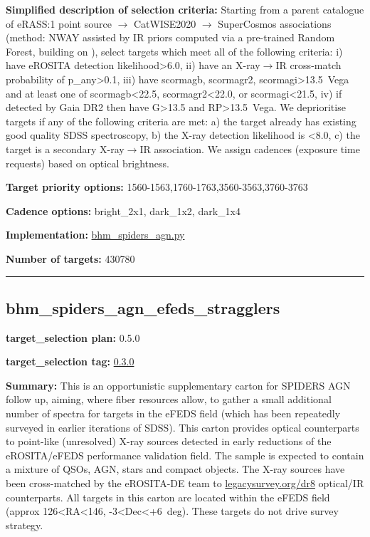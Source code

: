 \noindent\textbf{Simplified description of selection criteria:} Starting from a
parent catalogue of eRASS:1 point source $\rightarrow$ CatWISE2020 $\rightarrow$ SuperCosmos
associations (method: NWAY assisted by IR priors computed via a
pre-trained Random Forest, building on
\citealt{Salvato2022}), select targets which meet all of the following criteria:
i) have eROSITA detection likelihood\textgreater6.0, ii) have an
X-ray$\rightarrow$IR cross-match probability of p\_any\textgreater0.1, iii) have
scormagb, scormagr2, scormagi\textgreater13.5~Vega and at least one of
scormagb\textless22.5, scormagr2\textless22.0, or scormagi\textless21.5,
iv) if detected by Gaia DR2 then have G\textgreater13.5 and
RP\textgreater13.5~Vega. We deprioritise targets if any of the following
criteria are met: a) the target already has existing good quality SDSS
spectroscopy, b) the X-ray detection likelihood is \textless8.0, c) the
target is a secondary X-ray$\rightarrow$IR association. We assign cadences (exposure
time requests) based on optical brightness.


\noindent\textbf{Target priority options:}
1560-1563,1760-1763,3560-3563,3760-3763

\noindent\textbf{Cadence options:} bright\_2x1, dark\_1x2, dark\_1x4

\noindent\textbf{Implementation:}
\href{https://github.com/sdss/target_selection/blob/0.3.0/python/target_selection/cartons/bhm_spiders_agn.py}{bhm\_spiders\_agn.py}

\noindent\textbf{Number of targets:} 430780

\begin{center}\rule{0.5\linewidth}{0.5pt}\end{center}

\hypertarget{bhm_spiders_agn_efeds_stragglers_plan0.5.0}{%
\subsection{bhm\_spiders\_agn\_efeds\_stragglers}\label{bhm_spiders_agn_efeds_stragglers_plan0.5.0}}

\noindent\textbf{target\_selection plan:} 0.5.0

\noindent\textbf{target\_selection tag:}
\href{https://github.com/sdss/target_selection/tree/0.3.0/}{0.3.0}

\noindent\textbf{Summary:} This is an opportunistic supplementary carton for
SPIDERS AGN follow up, aiming, where fiber resources allow, to gather a
small additional number of spectra for targets in the eFEDS field (which
has been repeatedly surveyed in earlier iterations of SDSS). This carton
provides optical counterparts to point-like (unresolved) X-ray sources
detected in early reductions of the eROSITA/eFEDS performance validation
field. The sample is expected to contain a mixture of QSOs, AGN, stars
and compact objects. The X-ray sources have been cross-matched by the
eROSITA-DE team to
\href{https://www.legacysurvey.org/dr8/}{legacysurvey.org/dr8}
optical/IR counterparts. All targets in this carton are located within
the eFEDS field (approx 126\textless RA\textless146,
-3\textless Dec\textless+6~deg). These targets do not drive survey
strategy.

